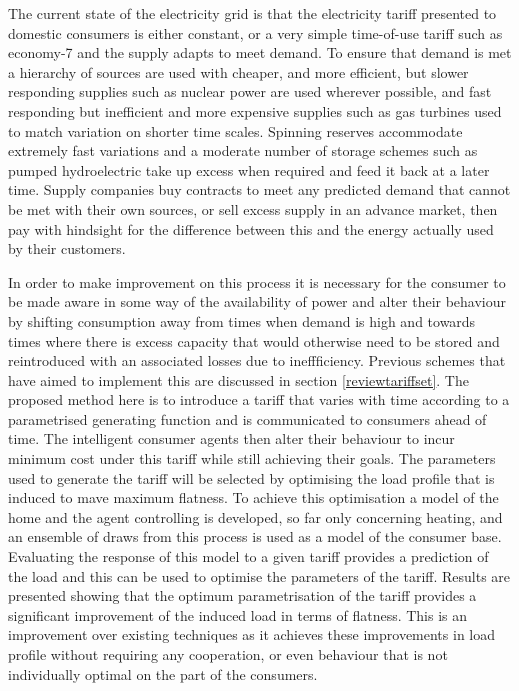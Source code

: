 \documentclass[a4paper, 10 pt, conference]{ieeeconf}  %
\begin{document}
The current state of the electricity grid is that the electricity tariff presented to domestic consumers is either constant, or a very simple time-of-use tariff such as economy-7 and the supply adapts to meet demand. To ensure that demand is met a hierarchy of sources are used with cheaper, and more efficient, but slower responding supplies such as nuclear power are used wherever possible, and fast responding but inefficient and more expensive supplies such as gas turbines used to match variation on shorter time scales. Spinning reserves accommodate extremely fast variations and a moderate number of storage schemes such as pumped hydroelectric take up excess when required and feed it back at a later time. Supply companies buy contracts to meet any predicted demand that cannot be met with their own sources, or sell excess supply in an advance market, then pay with hindsight for the difference between this and the energy actually used by their customers.

In order to make improvement on this process it is necessary for the consumer to be made aware in some way of the availability of power and alter their behaviour by shifting consumption away from times when demand is high and towards times where there is excess capacity that would otherwise need to be stored and reintroduced with an associated losses due to ineffficiency. Previous schemes that have aimed to implement this are discussed in section \ref{reviewtariffset}. The proposed method here is to introduce a tariff that varies with time according to a parametrised generating function and is communicated to consumers ahead of time. The intelligent consumer agents then alter their behaviour to incur minimum cost under this tariff while still achieving their goals. The parameters used to generate the tariff will be selected by optimising the load profile that is induced to mave maximum flatness.
To achieve this optimisation a model of the home and the agent controlling is developed, so far only concerning heating, and an ensemble of draws from this process is used as a model of the consumer base. Evaluating the response of this model to a given tariff provides a prediction of the load and this can be used to optimise the parameters of the tariff. Results are presented showing that the optimum parametrisation of the tariff provides a significant improvement of the induced load in terms of flatness. This is an improvement over existing techniques as it achieves these improvements in load profile without requiring any cooperation, or even behaviour that is not individually optimal on the part of the consumers.
\end{document}
